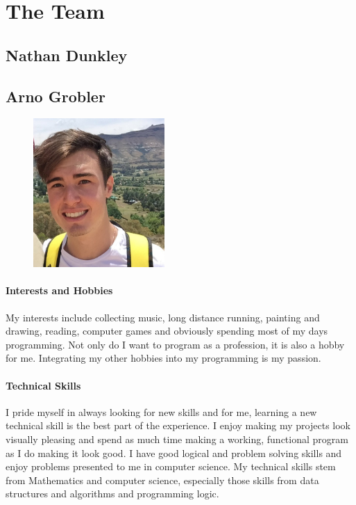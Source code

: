 \documentclass[english]{article}
\begin{document}
	\section{The Team}
		\subsection{Nathan Dunkley}
		
		\subsection{Arno Grobler}
			\begin{figure}
				\begin{center}
					\includegraphics[width=5cm]{arno.jpg}
				\end{center}
			\end{figure}
			\paragraph{Interests and Hobbies}
			My interests include collecting music, long distance running, painting and drawing, reading, computer games and obviously spending most of my days programming. Not only do I want to program as a profession, it is also a hobby for me. Integrating my other hobbies into my programming is my passion.
			
			\paragraph{Technical Skills}
            I pride myself in always looking for new skills and for me, learning a new technical skill is the best part of the experience. I enjoy making my projects look visually pleasing and spend as much time making a working, functional program as I do making it look good. I have good logical and problem solving skills and enjoy problems presented to me in computer science. My technical skills stem from Mathematics and computer science, especially those skills from data structures and algorithms and programming logic.
			
\end{document}
